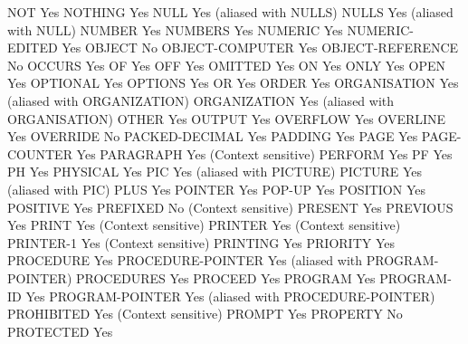NOT                             Yes
NOTHING                         Yes
NULL                            Yes (aliased with NULLS)
NULLS                           Yes (aliased with NULL)
NUMBER                          Yes
NUMBERS                         Yes
NUMERIC                         Yes
NUMERIC-EDITED                  Yes
OBJECT                          No
OBJECT-COMPUTER                 Yes
OBJECT-REFERENCE                No
OCCURS                          Yes
OF                              Yes
OFF                             Yes
OMITTED                         Yes
ON                              Yes
ONLY                            Yes
OPEN                            Yes
OPTIONAL                        Yes
OPTIONS                         Yes
OR                              Yes
ORDER                           Yes
ORGANISATION                    Yes (aliased with ORGANIZATION)
ORGANIZATION                    Yes (aliased with ORGANISATION)
OTHER                           Yes
OUTPUT                          Yes
OVERFLOW                        Yes
OVERLINE                        Yes
OVERRIDE                        No
PACKED-DECIMAL                  Yes
PADDING                         Yes
PAGE                            Yes
PAGE-COUNTER                    Yes
PARAGRAPH                       Yes (Context sensitive)
PERFORM                         Yes
PF                              Yes
PH                              Yes
PHYSICAL                        Yes
PIC                             Yes (aliased with PICTURE)
PICTURE                         Yes (aliased with PIC)
PLUS                            Yes
POINTER                         Yes
POP-UP                          Yes
POSITION                        Yes
POSITIVE                        Yes
PREFIXED                        No (Context sensitive)
PRESENT                         Yes
PREVIOUS                        Yes
PRINT                           Yes (Context sensitive)
PRINTER                         Yes (Context sensitive)
PRINTER-1                       Yes (Context sensitive)
PRINTING                        Yes
PRIORITY                        Yes
PROCEDURE                       Yes
PROCEDURE-POINTER               Yes (aliased with PROGRAM-POINTER)
PROCEDURES                      Yes
PROCEED                         Yes
PROGRAM                         Yes
PROGRAM-ID                      Yes
PROGRAM-POINTER                 Yes (aliased with PROCEDURE-POINTER)
PROHIBITED                      Yes (Context sensitive)
PROMPT                          Yes
PROPERTY                        No
PROTECTED                       Yes
